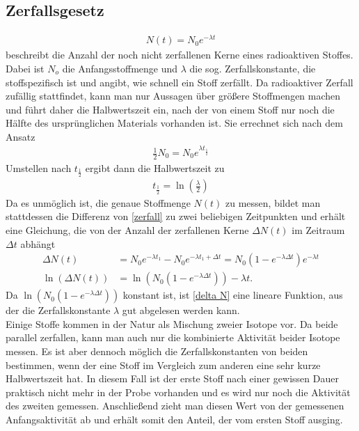 	\subsection{Zerfallsgesetz}
\begin{align}
	N(t)=N_0e^{-\lambda t}
	\label{zerfall}
\end{align}
beschreibt die Anzahl der noch nicht zerfallenen Kerne eines radioaktiven Stoffes. Dabei ist $N_o$ die Anfangsstoffmenge und $\lambda$ die sog. Zerfallskonstante, die stoffspezifisch ist und angibt, wie schnell ein Stoff zerfällt. Da radioaktiver Zerfall zufällig stattfindet, kann man nur Aussagen über größere Stoffmengen machen und führt daher die Halbwertszeit ein, nach der von einem Stoff nur noch die Hälfte des ursprünglichen Materials vorhanden ist. Sie errechnet sich nach dem Ansatz
\begin{align}
	\frac{1}{2}N_0=N_0e^{\lambda t_{\frac{1}{2}}}
\end{align}
Umstellen nach $t_{\frac{1}{2}}$ ergibt dann die Halbwertszeit zu
\begin{align}
	t_{\frac{1}{2}}=\ln\left(\frac{\lambda}{2}\right)
	\label{halbwertszeit}
\end{align}
Da es unmöglich ist, die genaue Stoffmenge $N(t)$ zu messen, bildet man stattdessen die Differenz von \ref{zerfall} zu zwei beliebigen Zeitpunkten und erhält eine Gleichung, die von der Anzahl der zerfallenen Kerne $\Delta N(t)$ im Zeitraum $\Delta t$ abhängt
\begin{align}
	\Delta N(t) &= N_0 e^{-\lambda t_1}-N_0 e^{-\lambda t_1+\Delta t} = N_0 (1-e^{-\lambda \Delta t}) e^{-\lambda t}\\
	\ln (\Delta N(t)) &= \ln (N_0 (1-e^{-\lambda \Delta t})) -\lambda t.
	\label{delta N}
\end{align}
Da $\ln (N_0 (1-e^{-\lambda \Delta t}))$ konstant ist, ist \ref{delta N} eine lineare Funktion, aus der die Zerfallskonstante $\lambda$ gut abgelesen werden kann.\\
Einige Stoffe kommen in der Natur als Mischung zweier Isotope vor. Da beide parallel zerfallen, kann man auch nur die kombinierte Aktivität beider Isotope messen.
Es ist aber dennoch möglich die Zerfallskonstanten von beiden bestimmen, wenn der eine Stoff im Vergleich zum anderen eine sehr kurze Halbwertszeit hat. In diesem Fall ist der erste Stoff nach einer gewissen Dauer praktisch nicht mehr in der Probe vorhanden und es wird nur noch die Aktivität des zweiten gemessen.
Anschließend zieht man diesen Wert von der gemessenen Anfangsaktivität ab und erhält somit den Anteil, der vom ersten Stoff ausging.

